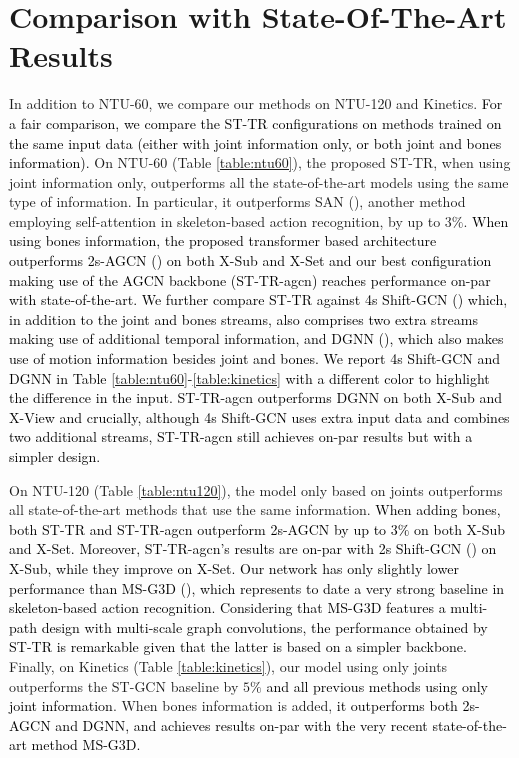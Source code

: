 \documentclass[times,twocolumn,final,authoryear]{elsarticle}
\DeclareRobustCommand{\new}[1]
{{\textcolor{black}{#1}}}
\begin{document}
\section{Comparison with State-Of-The-Art Results}\label{comparison}
In addition to NTU-60, we compare our methods on NTU-120 and Kinetics. \new{For a fair comparison, we compare the ST-TR configurations on methods trained on the same input data (either with joint information only, or both joint and bones information).}
On NTU-60 (Table \ref{table:ntu60}), the proposed ST-TR, when using joint information only, outperforms all the state-of-the-art models using the same type of information. In particular, it outperforms SAN (\cite{san}), another method employing self-attention in skeleton-based action recognition, by up to $3\%$. \new{When using bones information, the proposed transformer based architecture outperforms 2s-AGCN (\cite{Shi2018TwoStreamAG}) on both X-Sub and X-Set and our best configuration making use of the AGCN backbone (ST-TR-agcn) reaches performance on-par with state-of-the-art. We further compare ST-TR against 4s Shift-GCN (\cite{shift}) which, in addition to the joint and bones streams, also comprises two extra streams making use of additional temporal information, and DGNN (\cite{dirgraph}), which also makes use of motion information besides joint and bones. We report 4s Shift-GCN and DGNN in Table \ref{table:ntu60}-\ref{table:kinetics} with a different color to highlight the difference in the input. ST-TR-agcn outperforms DGNN on both X-Sub and X-View and crucially, although 4s Shift-GCN uses extra input data and combines two additional streams, ST-TR-agcn still achieves on-par results but with a simpler design. }

On NTU-120 (Table \ref{table:ntu120}), the model only based on joints outperforms all state-of-the-art methods that use the same information. \new{When adding bones, both ST-TR and ST-TR-agcn outperform 2s-AGCN by up to $3\%$ on both X-Sub and X-Set. Moreover, ST-TR-agcn's results are on-par with 2s Shift-GCN (\cite{shift}) on X-Sub, while they improve on X-Set. 
Our network has only slightly lower performance than MS-G3D (\cite{disent}), which represents to date a very strong baseline in skeleton-based action recognition. Considering that MS-G3D features a multi-path design with multi-scale graph convolutions, the performance obtained by ST-TR is remarkable given that the latter is based on a simpler backbone.}
Finally, on Kinetics (Table \ref{table:kinetics}), our model using only joints outperforms the ST-GCN baseline by $5\%$ \new{and all previous methods using only joint information}. When bones information is added, \new{it outperforms both 2s-AGCN and DGNN, and achieves results on-par with the very recent state-of-the-art method MS-G3D.}  
\end{document}
